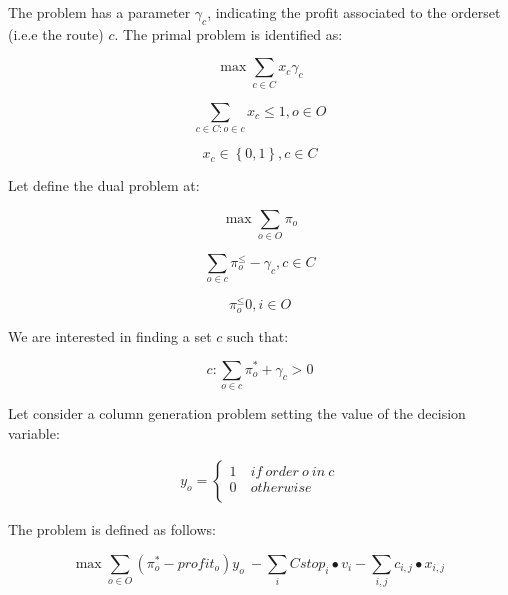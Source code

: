 The problem has a parameter $\gamma_c$, indicating the profit associated to the orderset (i.e.e the route) $c$. The primal problem is identified as:

\begin{equation}
    \max{\sum_{c\in C}{x_c\gamma_c}}
\end{equation}

\begin{equation}
    \sum_{c\in C:o\in c}{x_c\le1} , o\in O
\end{equation}

\begin{equation}
    x_c\in\left\{0,1\right\} , c\in C
\end{equation}

Let define the dual problem at:

\begin{equation}
    \max{\sum_{o\in O}\pi_o}
\end{equation}

\begin{equation}
    \sum_{o\in c}{\pi_o^ \le-\gamma_c} , c\in C
\end{equation}

\begin{equation}
    \pi_o^ \le0 , i\in O
\end{equation}

We are interested in finding a set $c$ such that:

\begin{equation}
    c:\sum_{o\in c}{\pi_o^\ast+\gamma_c>0}
\end{equation}

Let consider a column generation problem setting the value of the decision variable:

\begin{equation}
   \begin{split}
   y_o=\left\{
                \begin{array}{ll}
                  1\ & if\ order\ o\ in\ c \\
                  0 & otherwise\\
                \end{array}
              \right.
   \end{split}
\end{equation}

The problem is defined as follows:

\begin{equation}
    \max{\sum_{o\in O}{(\pi_o^\ast-profit_o)}y_o\ }-\sum_{i}{Cstop_i\bullet v_i}-\sum_{i,j}{c_{i,j}\bullet x_{i,j}\ }
\end{equation}

